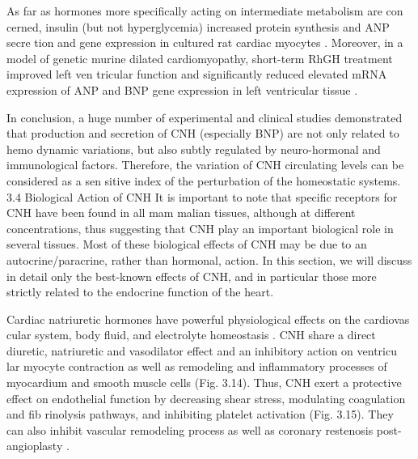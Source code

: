 \documentclass[14pt,a4paper,onecolumn]{extarticle}
\begin{document}
As far as hormones more specifically acting on intermediate metabolism are con cerned, insulin (but not hyperglycemia) increased protein synthesis and ANP secre tion and gene expression in cultured rat cardiac myocytes \citep{75}. Moreover, in a model of genetic murine dilated cardiomyopathy, short-term RhGH treatment improved left ven tricular function and significantly reduced elevated mRNA expression of ANP and BNP gene expression in left ventricular tissue \citep{76}.

In conclusion, a huge number of experimental and clinical studies demonstrated that production and secretion of CNH (especially BNP) are not only related to hemo dynamic variations, but also subtly regulated by neuro-hormonal and immunological factors. Therefore, the variation of CNH circulating levels can be considered as a sen sitive index of the perturbation of the homeostatic systems.  3.4 Biological Action of CNH It is important to note that specific receptors for CNH have been found in all mam malian tissues, although at different concentrations, thus suggesting that CNH play an important biological role in several tissues. Most of these biological effects of CNH may be due to an autocrine/paracrine, rather than hormonal, action. In this section, we will discuss in detail only the best-known effects of CNH, and in particular those more strictly related to the endocrine function of the heart.

Cardiac natriuretic hormones have powerful physiological effects on the cardiovas cular system, body fluid, and electrolyte homeostasis \citep{13}\citep{28}\citep{30}\citep{77}\citep{78}. CNH share a direct diuretic, natriuretic and vasodilator effect and an inhibitory action on ventricu lar myocyte contraction \citep{79} as well as remodeling and inflammatory processes of myocardium and smooth muscle cells \citep{80-83} (Fig. 3.14). Thus, CNH exert a protective effect on endothelial function by decreasing shear stress, modulating coagulation and fib rinolysis pathways, and inhibiting platelet activation (Fig. 3.15). They can also inhibit vascular remodeling process as well as coronary restenosis post-angioplasty \citep{56}\citep{84-89}.
\end{document}
